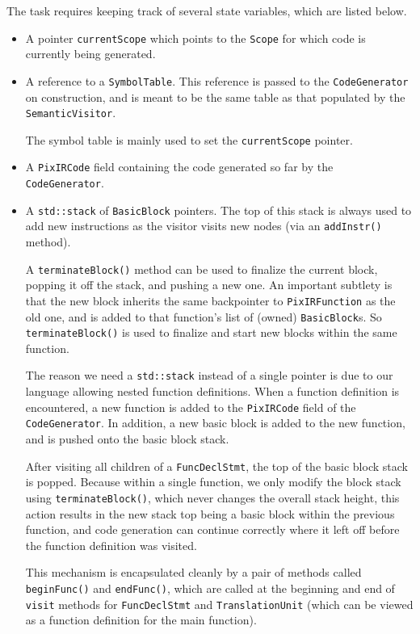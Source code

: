 \documentclass[11pt,a4paper]{scrartcl}
\begin{document}
The task requires keeping track of several state variables, which are listed below.
\begin{itemize}
  \item A pointer \verb|currentScope| which points to the \verb|Scope| for which code is currently being generated.

  \item A reference to a \verb|SymbolTable|. This reference is passed to the \verb|CodeGenerator| on construction, and is meant to be the same table as that populated by the \verb|SemanticVisitor|.

        The symbol table is mainly used to set the \verb|currentScope| pointer.

  \item A \verb|PixIRCode| field containing the code generated so far by the \verb|CodeGenerator|.

  \item A \verb|std::stack| of \verb|BasicBlock| pointers. The top of this stack is always used to add new instructions as the visitor visits new nodes (via an \verb|addInstr()| method).

        A \verb|terminateBlock()| method can be used to finalize the current block, popping it off the stack, and pushing a new one. An important subtlety is that the new block inherits the same backpointer to \verb|PixIRFunction| as the old one, and is added to that function's list of (owned) \verb|BasicBlock|s. So \verb|terminateBlock()| is used to finalize and start new blocks within the same function.

        The reason we need a \verb|std::stack| instead of a single pointer is due to our language allowing nested function definitions. When a function definition is encountered, a new function is added to the \verb|PixIRCode| field of the \verb|CodeGenerator|. In addition, a new basic block is added to the new function, and is pushed onto the basic block stack.

        After visiting all children of a \verb|FuncDeclStmt|, the top of the basic block stack is popped. Because within a single function, we only modify the block stack using \verb|terminateBlock()|, which never changes the overall stack height, this action results in the new stack top being a basic block within the previous function, and code generation can continue correctly where it left off before the function definition was visited.

        This mechanism is encapsulated cleanly by a pair of methods called \verb|beginFunc()| and \verb|endFunc()|, which are called at the beginning and end of \verb|visit| methods for \verb|FuncDeclStmt| and \verb|TranslationUnit| (which can be viewed as a function definition for the main function).


\end{itemize}
\end{document}
